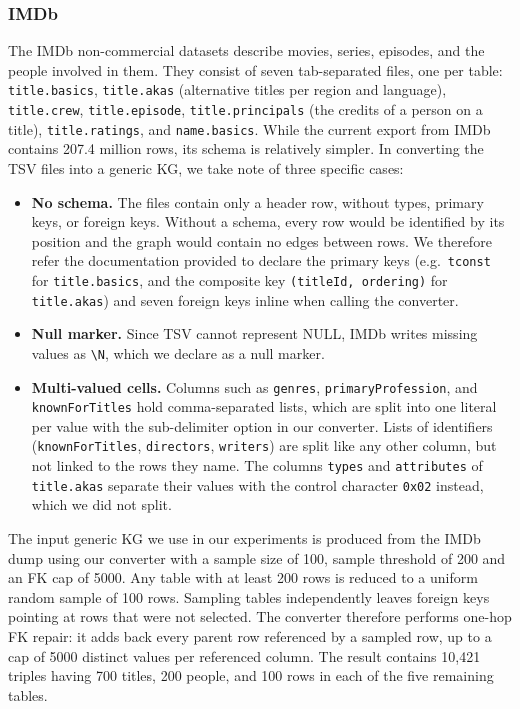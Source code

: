 
\subsubsection{IMDb}

The IMDb non-commercial datasets \citep{imdb_datasets} describe movies, series, episodes, and the people involved in them. They consist of seven tab-separated files, one per table: \texttt{title.basics}, \texttt{title.akas} (alternative titles per region and language), \texttt{title.crew}, \texttt{title.episode}, \texttt{title.principals} (the credits of a person on a title), \texttt{title.ratings}, and \texttt{name.basics}. While the current export from IMDb contains 207.4 million rows, its schema is relatively simpler. In converting the TSV files into a generic KG, we take note of three specific cases:
\begin{itemize}[leftmargin=*, itemsep=2pt]
  \item \textbf{No schema.} The files contain only a header row, without types, primary keys, or foreign keys. Without a schema, every row would be identified by its position and the graph would contain no edges between rows. We therefore refer the documentation provided to declare the primary keys (e.g.\ \texttt{tconst} for \texttt{title.basics}, and the composite key \texttt{(titleId, ordering)} for \texttt{title.akas}) and seven foreign keys inline when calling the converter. 
  \item \textbf{Null marker.} Since TSV cannot represent NULL, IMDb writes missing values as \texttt{\textbackslash N}, which we declare as a null marker.
  \item \textbf{Multi-valued cells.} Columns such as \texttt{genres}, \texttt{primaryProfession}, and \texttt{knownForTitles} hold comma-separated lists, which are split into one literal per value with the sub-delimiter option in our converter. Lists of identifiers (\texttt{knownForTitles}, \texttt{directors}, \texttt{writers}) are split like any other column, but not linked to the rows they name. The columns \texttt{types} and \texttt{attributes} of \texttt{title.akas} separate their values with the control character \texttt{0x02} instead, which we did not split.
\end{itemize}
The input generic KG we use in our experiments is produced from the IMDb dump using our converter with a sample size of 100, sample threshold of 200 and an FK cap of 5000. Any table with at least 200 rows is reduced to a uniform random sample of 100 rows. Sampling tables independently leaves foreign keys pointing at rows that were not selected. The converter therefore performs one-hop FK repair: it adds back every parent row referenced by a sampled row, up to a cap of 5000 distinct values per referenced column. The result contains 10,421 triples having 700 titles, 200 people, and 100 rows in each of the five remaining tables.
